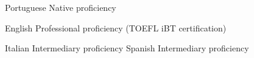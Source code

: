 
\begin{cvskills}

  \cvskill
    {Portuguese} %
    {Native proficiency} %

  \cvskill
    {English} %
    {Professional proficiency (TOEFL iBT certification)} %

  \cvskill
    {Italian} %
    {Intermediary proficiency} %
  \cvskill
    {Spanish} %
    {Intermediary proficiency} %

\end{cvskills}
